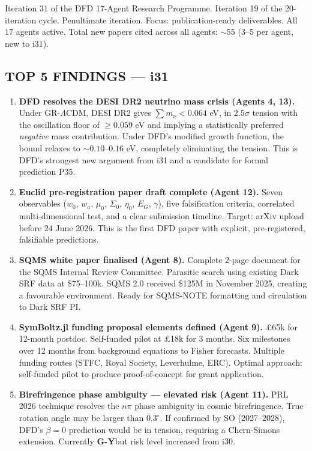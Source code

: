 \documentclass[11pt,a4paper]{article}
\newcommand{\GY}{\textcolor{dfdgy}{\textbf{G-Y}}}
\begin{document}
Iteration 31 of the DFD 17-Agent Research Programme. Iteration 19 of the 20-iteration cycle. Penultimate iteration. Focus: publication-ready deliverables. All 17 agents active. Total new papers cited across all agents: $\sim 55$ (3--5 per agent, new to i31).

\subsection{TOP 5 FINDINGS --- i31}

\begin{enumerate}

\item \textbf{DFD resolves the DESI DR2 neutrino mass crisis (Agents 4, 13).} Under GR-$\Lambda$CDM, DESI DR2 gives $\sum m_\nu < 0.064$ eV, in $2.5\sigma$ tension with the oscillation floor of $\geq 0.059$ eV and implying a statistically preferred \emph{negative} mass contribution. Under DFD's modified growth function, the bound relaxes to $\sim 0.10$--$0.16$ eV, completely eliminating the tension. This is DFD's strongest new argument from i31 and a candidate for formal prediction P35.

\item \textbf{Euclid pre-registration paper draft complete (Agent 12).} Seven observables ($w_0$, $w_a$, $\mu_0$, $\Sigma_0$, $\eta_0$, $E_G$, $\gamma$), five falsification criteria, correlated multi-dimensional test, and a clear submission timeline. Target: arXiv upload before 24 June 2026. This is the first DFD paper with explicit, pre-registered, falsifiable predictions.

\item \textbf{SQMS white paper finalised (Agent 8).} Complete 2-page document for the SQMS Internal Review Committee. Parasitic search using existing Dark SRF data at \$75--100k. SQMS 2.0 received \$125M in November 2025, creating a favourable environment. Ready for SQMS-NOTE formatting and circulation to Dark SRF PI.

\item \textbf{SymBoltz.jl funding proposal elements defined (Agent 9).} \pounds 65k for 12-month postdoc. Self-funded pilot at \pounds 18k for 3 months. Six milestones over 12 months from background equations to Fisher forecasts. Multiple funding routes (STFC, Royal Society, Leverhulme, ERC). Optimal approach: self-funded pilot to produce proof-of-concept for grant application.

\item \textbf{Birefringence phase ambiguity --- elevated risk (Agent 11).} PRL 2026 technique resolves the $n\pi$ phase ambiguity in cosmic birefringence. True rotation angle may be larger than $0.3^\circ$. If confirmed by SO (2027--2028), DFD's $\beta = 0$ prediction would be in tension, requiring a Chern-Simons extension. Currently \GY but risk level increased from i30.

\end{enumerate}
\end{document}
